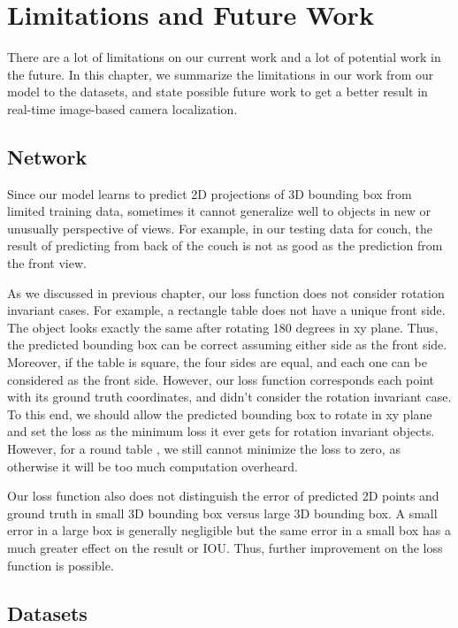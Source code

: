 \chapter{Limitations and Future Work}

There are a lot of limitations on our current work and a lot of potential work in the future. In this chapter, we summarize the limitations in our work from our model to the datasets, and state possible future work to get a better result in real-time image-based camera localization.

\section{Network}

Since our model learns to predict 2D projections of 3D bounding box from limited training data, sometimes it cannot generalize well to objects in new or unusually perspective of views. For example, in our testing data for couch, the result of predicting from back of the couch is not as good as the prediction from the front view.

As we discussed in previous chapter, our loss function does not consider rotation invariant cases. For example, a rectangle table does not have a unique front side. The object looks exactly the same after rotating 180 degrees in xy plane. Thus, the predicted bounding box can be correct assuming either side as the front side. Moreover, if the table is square, the four sides are equal, and each one can be considered as the front side. However, our loss function corresponds each point with its ground truth coordinates, and didn't consider the rotation invariant case. To this end, we should allow the predicted bounding box to rotate in xy plane and set the loss as the minimum loss it ever gets for rotation invariant objects. However, for a round table , we still cannot minimize the loss to zero, as otherwise it will be too much computation overheard.

Our loss function also does not distinguish the error of predicted 2D points and ground truth in small 3D bounding box versus large 3D bounding box. A small error in a large box is generally negligible but the same error in a small box has a much greater effect on the result or IOU. Thus, further improvement on the loss function is possible.

\section{Datasets}
